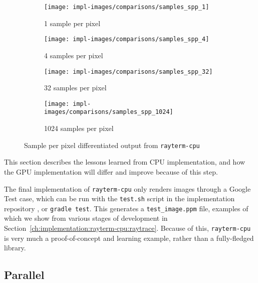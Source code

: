 \vspace{0.3em}
\begin{figure}[htb]
  \centering
  \begin{subfigure}[htb]{0.45\textwidth}
    \texttt{[image: impl-images/comparisons/samples\_spp\_1]}
    \caption{1 sample per pixel}
    \label{fig:rayterm-cpu_ppm_noisy_1}
  \end{subfigure}
  \hspace{1em}
  \begin{subfigure}[htb]{0.45\textwidth}
    \texttt{[image: impl-images/comparisons/samples\_spp\_4]}
    \caption{4 samples per pixel}
    \label{fig:rayterm-cpu_ppm_noisy_4}
  \end{subfigure}
  \vspace{1em}
  \begin{subfigure}[htb]{0.45\textwidth}
    \texttt{[image: impl-images/comparisons/samples\_spp\_32]}
    \caption{32 samples per pixel}
    \label{fig:rayterm-cpu_ppm_noisy_32}
  \end{subfigure}
  \hspace{1em}
  \begin{subfigure}[htb]{0.45\textwidth}
    \texttt{[image: impl-images/comparisons/samples\_spp\_1024]}
    \caption{1024 samples per pixel}
    \label{fig:rayterm-cpu_ppm_noisy_1024}
  \end{subfigure}
  \caption{Sample per pixel differentiated output from \texttt{rayterm-cpu}}
  \label{fig:rayterm-cpu_ppm_noisy}
\end{figure}

 \label{ch:methods:renderer:sequential:prototype}

This section describes the lessons learned from CPU implementation, and how the GPU implementation will differ and improve because of this step.

The final implementation of \texttt{rayterm-cpu} only renders images through a Google Test \cite{googletest} case, which can be run with the \texttt{test.sh} script in the implementation repository \cite{raytermCpuImpl}, or \texttt{gradle test}.
This generates a \texttt{test\_image.ppm} file, examples of which we show from various stages of development in Section~\ref{ch:implementation:rayterm-cpu:raytrace}.
Because of this, \texttt{rayterm-cpu} is very much a proof-of-concept and learning example, rather than a fully-fledged library.

\subsection{Parallel} \label{ch:methods:renderer:parallel}

